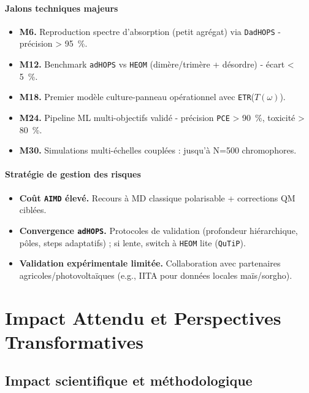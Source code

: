 \documentclass[12pt, a4paper]{article}
\begin{document}
\paragraph{Jalons techniques majeurs}
\begin{itemize}
    \item \textbf{M6.} Reproduction spectre d'absorption (petit agrégat) via \texttt{DadHOPS} - précision > \SI{95}{\percent}.
    \item \textbf{M12.} Benchmark \texttt{adHOPS} vs \texttt{HEOM} (dimère/trimère + désordre) - écart < \SI{5}{\percent}.
    \item \textbf{M18.} Premier modèle culture-panneau opérationnel avec \texttt{ETR}($T(\omega)$).
    \item \textbf{M24.} Pipeline ML multi-objectifs validé - précision \texttt{PCE} > \SI{90}{\percent}, toxicité > \SI{80}{\percent}.
    \item \textbf{M30.} Simulations multi-échelles couplées : jusqu'à N=500 chromophores.
\end{itemize}

\paragraph{Stratégie de gestion des risques}
\begin{itemize}
    \item \textbf{Coût \texttt{AIMD} élevé.} Recours à MD classique polarisable + corrections QM ciblées.
    \item \textbf{Convergence \texttt{adHOPS}.} Protocoles de validation (profondeur hiérarchique, pôles, steps adaptatifs) ; si lente, switch à \texttt{HEOM} lite (\texttt{QuTiP}).
    \item \textbf{Validation expérimentale limitée.} Collaboration avec partenaires agricoles/photovoltaïques (e.g., IITA pour données locales maïs/sorgho).
\end{itemize}

\section{Impact Attendu et Perspectives Transformatives}

\subsection{Impact scientifique et méthodologique}
\end{document}
